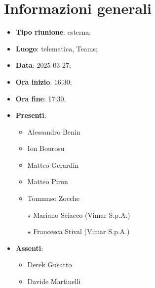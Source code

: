 \section{Informazioni generali}
\begin{itemize}
  \item \textbf{Tipo riunione}: esterna;
  \item \textbf{Luogo}: telematica, Teams;
  \item \textbf{Data}: 2025-03-27;
  \item \textbf{Ora inizio}: 16:30;
  \item \textbf{Ora fine}: 17:30.
  
  \item \textbf{Presenti}:
  \begin{itemize}
    \item Alessandro Benin
    \item Ion Bourosu
    \item Matteo Gerardin
    \item Matteo Piron
    \item Tommaso Zocche
    \item[$\star$] Mariano Sciacco (Vimar S.p.A.)
    \item[$\star$] Francesca Stival (Vimar S.p.A.)
  \end{itemize}

  \item \textbf{Assenti}:
  \begin{itemize}
      \item Derek Gusatto
      \item Davide Martinelli
  \end{itemize}
 
\end{itemize}